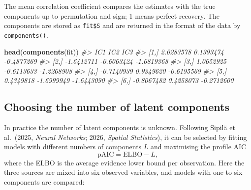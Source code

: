 \documentclass[
]{article}
\newenvironment{Shaded}{\begin{snugshade}}{\end{snugshade}}
\newcommand{\CommentTok}[1]{\textcolor[rgb]{0.56,0.35,0.01}{\textit{#1}}}
\newcommand{\FunctionTok}[1]{\textcolor[rgb]{0.13,0.29,0.53}{\textbf{#1}}}
\newcommand{\NormalTok}[1]{#1}
\begin{document}
The mean correlation coefficient compares the estimates with the true
components up to permutation and sign; 1 means perfect recovery. The
components are stored as \texttt{fit\$S} and are returned in the format
of the data by \texttt{components()}.

\begin{Shaded}
\begin{Highlighting}[]
\FunctionTok{head}\NormalTok{(}\FunctionTok{components}\NormalTok{(fit))}
\CommentTok{\#\textgreater{}             IC1        IC2        IC3}
\CommentTok{\#\textgreater{} [1,]  2.0283578  0.1393474 {-}0.4877269}
\CommentTok{\#\textgreater{} [2,] {-}1.6412711 {-}0.6063424 {-}1.6819368}
\CommentTok{\#\textgreater{} [3,]  1.0652925 {-}0.6113633 {-}1.2268908}
\CommentTok{\#\textgreater{} [4,] {-}0.7140939  0.9349620 {-}0.6195569}
\CommentTok{\#\textgreater{} [5,]  0.4349818 {-}1.6999949 {-}1.6443090}
\CommentTok{\#\textgreater{} [6,] {-}0.8067482  0.4258073 {-}0.2712600}
\end{Highlighting}
\end{Shaded}

\subsection{Choosing the number of latent
components}\label{choosing-the-number-of-latent-components}

In practice the number of latent components is unknown. Following Sipilä
et al.~(2025, \emph{Neural Networks}; 2026, \emph{Spatial Statistics}),
it can be selected by fitting models with different numbers of
components \(L\) and maximising the profile AIC
\[\mathrm{pAIC} = \mathrm{ELBO} - L,\] where the ELBO is the average
evidence lower bound per observation. Here the three sources are mixed
into six observed variables, and models with one to six components are
compared:
\end{document}

